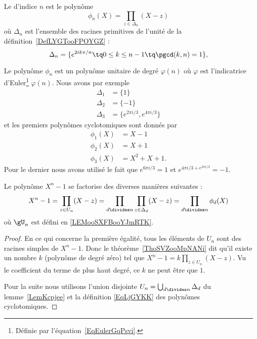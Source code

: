 \begin{definition}  \label{DefXGHooRAXlpp}
	Le  d'indice \( n\) est le polynôme
	\begin{equation}    \label{EqLjGYKK}
		\phi_n(X)=\prod_{z\in\Delta_n}(X-z)
	\end{equation}
	où \( \Delta_n\) est l'ensemble des racines primitives de l'unité de la définition~\ref{DefLYGTooFPOYGZ} :
	\begin{equation}
		\Delta_n=\{  e^{2ik\pi/n}\tq 0\leq k\leq n-1\tq \pgcd(k,n)=1 \},
	\end{equation}
\end{definition}

Le polynôme \( \phi_n\) est un polynôme unitaire de degré \( \varphi(n)\) où \( \varphi\) est l'indicatrice d'Euler\footnote{Définie par l'équation~\ref{EqEulerGqPsvi}.} \( \varphi(n)\). Nous avons par exemple
\begin{subequations}
	\begin{align}
		\Delta_1 & =\{  1 \}                          \\
		\Delta_2 & =\{ -1 \}                          \\
		\Delta_3 & =\{  e^{2\pi i/3}, e^{4\pi i/3} \}
	\end{align}
\end{subequations}
et les premiers polynômes cyclotomiques sont donnés par
\begin{subequations}
	\begin{align}
		\phi_1(X) & =X-1      \\
		\phi_2(X) & =X+1      \\
		\phi_3(X) & =X^2+X+1.
	\end{align}
\end{subequations}
Pour le dernier nous avons utilisé le fait que \( e^{6\pi i/3}=1\) et \( e^{4\pi i/3+ e^{2\pi i/3}}=-1\).

\begin{lemma}   \label{LemKYGBooAwpOHD}
	Le polynôme \( X^n-1\) se factorise des diverses manières suivantes :
	\begin{equation}
		X^n-1=\prod_{z\in U_n}(X-z)=\prod_{d\divides n}\prod_{z\in \Delta_d}(X-z)=\prod_{d\divides n}\phi_d(X)
	\end{equation}
	où \( \gU_n\) est défini en \ref{LEMooSXFBooYJmRTK}.
\end{lemma}

\begin{proof}
	En ce qui concerne la première égalité, tous les éléments de \( U_n\) sont des racines simples de \( X^n-1\). Donc le théorème~\ref{ThoSVZooMpNANi} dit qu'il existe un nombre \( k\) (polynôme de degré zéro) tel que \( X^n-1=k\prod_{z\in U_n}(X-z)\). Vu le coefficient du terme de plus haut degré, ce \( k\) ne peut être que \( 1\).

	Pour la suite nous utilisons l'union disjointe \( U_n=\bigcup_{d\divides n}\Delta_d\) du lemme~\ref{LemKcpjee} et la définition \eqref{EqLjGYKK} des polynômes cyclotomiques.
\end{proof}

